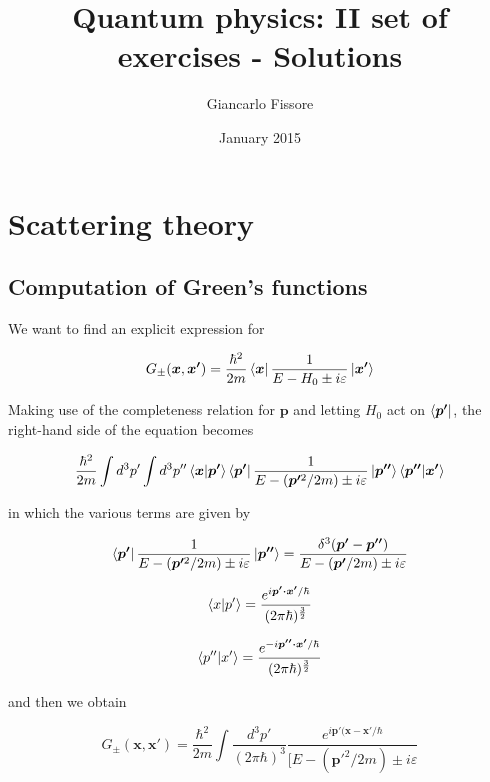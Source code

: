 \documentclass{article}
\begin{document}
\title{Quantum physics: II set of exercises - Solutions}
\author{Giancarlo Fissore}
\date{January 2015}
\maketitle

\section{Scattering theory}

\subsection{Computation of Green’s functions}

We want to find an explicit expression for

\begin{equation}
G_{\pm}(\bm{x},\bm{x'}) = \frac{\hbar^2}{2m} \bra{\bm{x}} \frac{1}{E - H_0 \pm i\varepsilon} \ket{\bm{x'}}
\end{equation}

Making use of the completeness relation for \( \bm{p} \) and letting \( H_0 \) act on \( \bra{\bm{p'}} \), the right-hand side of the equation becomes

\begin{equation}
\frac{\hbar^2}{2m} \int d^3p' \int d^3p'' \braket{\bm{x}}{\bm{p'}} \bra{\bm{p'}} \frac{1}{E - (\bm{p'}^2/2m) \pm i\varepsilon} \ket{\bm{p''}} \braket{\bm{p''}}{\bm{x'}}
\end{equation}

in which the various terms are given by

\begin{equation}
\bra{\bm{p'}} \frac{1}{E - (\bm{p'}^2/2m) \pm i\varepsilon} \ket{\bm{p''}} = \frac{\delta^3(\bm{p'}-\bm{p''})}{E - (\bm{p'}/2m) \pm i \varepsilon}
\end{equation}

\begin{equation}
\braket{x}{p'} = \frac{e^{i\bm{p' \cdot x'}/\hbar}}{(2\pi\hbar)^{\frac{3}{2}}}
\end{equation}

\begin{equation}
\braket{p''}{x'} = \frac{e^{-i\bm{p'' \cdot x'}/\hbar}}{(2\pi\hbar)^{\frac{3}{2}}}
\end{equation}

and then we obtain

\begin{equation}
G_{\pm}(\bm{x},\bm{x'}) = \frac{\hbar^2}{2m} \int \frac{d^3p'}{(2\pi\hbar)^3} \frac{e^{i\bm{p'}(\bm{x}-\bm{x'}/\hbar}}{[E - (\bm{p'}^2/2m) \pm i \varepsilon}
\end{equation}
\end{document}
